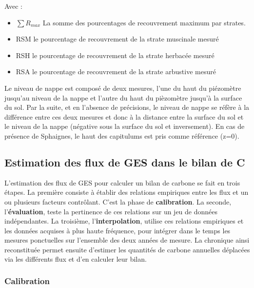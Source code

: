 Avec :
\begin{itemize}
\item $\sum R_{max}$ La somme des pourcentages de recouvrement maximum par strates.
\item RSM le pourcentage de recouvrement de la strate muscinale mesuré
\item RSH le pourcentage de recouvrement de la strate herbacée mesuré
\item RSA le pourcentage de recouvrement de la strate arbustive mesuré
\end{itemize}

Le niveau de nappe est composé de deux mesures, l'une du haut du piézomètre jusqu'au niveau de la nappe et l'autre du haut du pièzomètre jusqu'à la surface du sol. 
Par la suite, et en l'absence de précisions, le niveau de nappe se réfère à la différence entre ces deux mesures et donc à la distance entre la surface du sol et le niveau de la nappe (négative sous la surface du sol et inversement).
En cas de présence de Sphaignes, le haut des capitulums est pris comme référence (z=0).

\subsection{Estimation des flux de GES dans le bilan de C}

L'estimation des flux de GES pour calculer un bilan de carbone se fait en trois étapes.
La première consiste à établir des relations empiriques entre les flux et un ou plusieurs facteurs contrôlant.
C'est la phase de \textbf{calibration}.
La seconde, l'\textbf{évaluation}, teste la pertinence de ces relations sur un jeu de données indépendantes.
La troisième, l'\textbf{interpolation}, utilise ces relations empiriques et les données acquises à plus haute fréquence, pour intégrer dans le temps les mesures ponctuelles sur l'ensemble des deux années de mesure. 
La chronique ainsi reconstituée permet ensuite d'estimer les quantités de carbone annuelles déplacées via les différents flux et d'en calculer leur bilan.

\subsubsection{Calibration}


